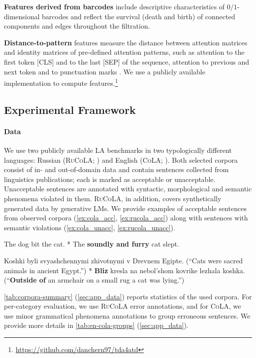 \documentclass[11pt]{article}
\newcommand\decreasespace{\vspace{-5pt}}
\begin{document}
\textbf{Features derived from barcodes} include descriptive characteristics of $0/1$-dimensional barcodes and reflect the survival (death and birth) of connected components and edges throughout the filtration. 

\textbf{Distance-to-pattern} features measure the distance between attention matrices and identity matrices of pre-defined attention patterns, such as attention to the first token \textsc{[CLS]} and to the last \textsc{[SEP]} of the sequence, attention to previous and next token and to punctuation marks \cite{clark-etal-2019-bert}.
We use a publicly available implementation to compute features.\footnote {\href{https://github.com/danchern97/tda4atd}{https://github.com/danchern97/tda4atd}}

\subsection{Experimental Framework}
\paragraph{Data}
We use two publicly available LA benchmarks in two typologically different languages: Russian (\textsc{RuCoLA}; \citealp{mikhailov-etal-2022-rucola}) and English (\textsc{CoLA}; \citealp{warstadt-etal-2019-neural}).
Both selected corpora consist of in- and out-of-domain data and contain sentences collected from linguistics publications; each is marked as acceptable or unacceptable. 
Unacceptable sentences are annotated with syntactic, morphological and semantic phenomena violated in them.
\textsc{RuCoLA}, in addition, covers synthetically generated data by generative LMs.
We provide examples of acceptable sentences from observed corpora (\ref{ex:cola_acc}, \ref{ex:rucola_acc}) along with sentences with semantic violations (\ref{ex:cola_unacc}, \ref{ex:rucola_unacc}).
\begin{exe}
\ex \begin{xlist}
    \ex\label{ex:cola_acc} The dog bit the cat.
    \ex\label{ex:cola_unacc} * The \textbf{soundly and furry} cat slept.
    \end{xlist}
\ex \begin{xlist}
    \ex\label{ex:rucola_acc} Koshki byli svyashchennymi zhivotnymi v Drevnem Egipte. 
     (``Cats were sacred animals in ancient Egypt.'')
    \ex\label{ex:rucola_unacc} * \textbf{Bliz} kresla na nebol'shom kovrike lezhala koshka.
    (``\textbf{Outside of} an armchair on a small rug a cat was lying.'')
    \end{xlist}
\end{exe}
\decreasespace
\autoref{tab:corpora-summary} (\autoref{sec:app_data}) reports statistics of the used corpora.
For per-category evaluation, we use \textsc{RuCoLA} error annotations, and for \textsc{CoLA}, we use minor grammatical phenomena annotations to group erroneous sentences. 
We provide more details in \autoref{tab:en-cola-groups} (\autoref{sec:app_data}). 
\end{document}

